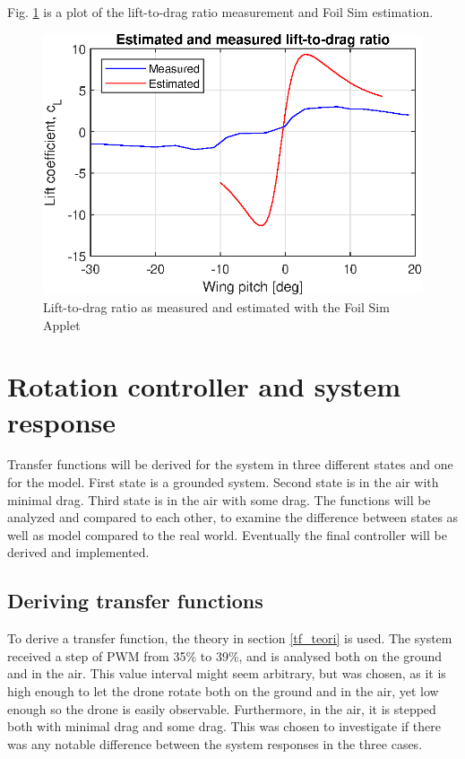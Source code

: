 Fig. \ref{fig:LDratio_measured} is a plot of the lift-to-drag ratio measurement and Foil Sim estimation.
\begin{figure}[h]
    \centering
    \includegraphics{figures/results/LDratio_measured.eps}
    \caption{Lift-to-drag ratio as measured and estimated with the Foil Sim Applet}
    \label{fig:LDratio_measured}
\end{figure}
\newpage

\section{Rotation controller and system response}\label{results:rotcontroller}
Transfer functions will be derived for the system in three different states and one for the model. First state is a grounded system. Second state is in the air with minimal drag. Third state is in the air with some drag. The functions will be analyzed and compared to each other, to examine the difference between states as well as model compared to the real world. 
Eventually the final controller will be derived and implemented. 


\subsection{Deriving transfer functions}
To derive a transfer function, the theory in section \ref{tf_teori} is used. The system received a step of PWM from 35\% to 39\%, and is analysed both on the ground and in the air. This value interval might seem arbitrary, but was chosen, as it is high enough to let the drone rotate both on the ground and in the air, yet low enough so the drone is easily observable. Furthermore, in the air, it is stepped both with minimal drag and some drag. This was chosen to investigate if there was any notable difference between the system responses in the three cases. 

